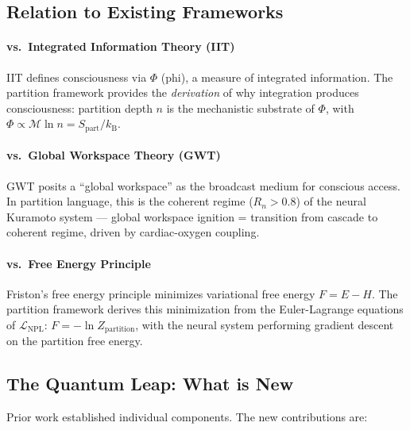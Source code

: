\documentclass[12pt,a4paper]{article}
\theoremstyle{definition}
\newcommand{\kB}{k_{\text{B}}}
\newcommand{\LNPL}{\mathcal{L}_{\text{NPL}}}
\begin{document}
\subsection{Relation to Existing Frameworks}

\paragraph{vs.\ Integrated Information Theory (IIT)}
IIT defines consciousness via $\Phi$ (phi), a measure of integrated information.
The partition framework provides the \emph{derivation} of why integration
produces consciousness: partition depth $n$ is the mechanistic substrate of $\Phi$,
with $\Phi \propto \mathcal{M} \ln n = S_{\text{part}}/\kB$.

\paragraph{vs.\ Global Workspace Theory (GWT)}
GWT posits a ``global workspace'' as the broadcast medium for conscious access.
In partition language, this is the coherent regime ($R_n > 0.8$) of the
neural Kuramoto system — global workspace ignition = transition from cascade
to coherent regime, driven by cardiac-oxygen coupling.

\paragraph{vs.\ Free Energy Principle}
Friston's free energy principle minimizes variational free energy $F = E - H$.
The partition framework derives this minimization from the Euler-Lagrange
equations of $\LNPL$: $F = -\ln Z_{\text{partition}}$, with the neural
system performing gradient descent on the partition free energy.

\subsection{The Quantum Leap: What is New}

Prior work established individual components. The new contributions are:
\end{document}
